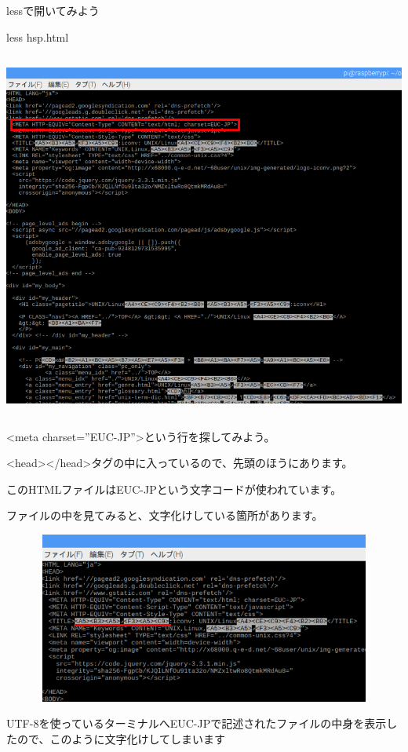 \documentclass[a4paper,12pt,dvipdfmx]{jarticle}
\begin{document}
\bigskip

\clearpage
lessで開いてみよう

less hsp.html



\begin{center}
\includegraphics[width=17.006cm,height=12.086cm]{textbook-img021-1.png}

\end{center}
{\textless}meta
charset=”EUC-JP”{\textgreater}という行を探してみよう。

{\textless}head{\textgreater}{\textless}/head{\textgreater}タグの中に入っているので、先頭のほうにあります。

このHTMLファイルはEUC-JPという文字コードが使われています。

ファイルの中を見てみると、文字化けしている箇所があります。



\begin{center}
\includegraphics[width=17.006cm,height=5.63cm]{textbook-img021-2.png}

\end{center}
UTF-8を使っているターミナルへEUC-JPで記述されたファイルの中身を表示したので、このように文字化けしてしまいます
\end{document}
